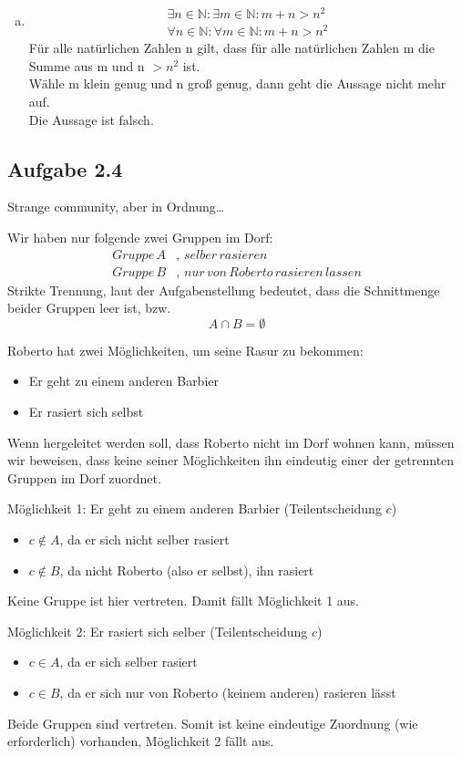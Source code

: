\documentclass{standalone}
\begin{document}
\begin{enumerate}[a)]
    \item \begin{gather}
        \exists n \in \mathbb{N} : \exists m \in \mathbb{N} : m+n > n^2 \\
        \forall n \in \mathbb{N} : \forall m \in \mathbb{N} : m+n > n^2
    \end{gather}
    Für alle natürlichen Zahlen n gilt, dass für alle natürlichen Zahlen m die Summe aus m und n $>n^2$ ist. \\
    Wähle m klein genug und n groß genug, dann geht die Aussage nicht mehr auf. \\
    Die Aussage ist falsch.
\end{enumerate}

\subsection{Aufgabe 2.4}
Strange community, aber in Ordnung\dots

Wir haben nur folgende zwei Gruppen im Dorf:
\begin{align}
    Gruppe\, A&,\, selber\, rasieren \\
    Gruppe\, B&,\, nur\, von\, Roberto\, rasieren\, lassen
\end{align}
Strikte Trennung, laut der Aufgabenstellung bedeutet, dass die Schnittmenge beider Gruppen leer ist, bzw.
$$ A \cap B = \emptyset $$

Roberto hat zwei Möglichkeiten, um seine Rasur zu bekommen:
\begin{itemize}
    \item Er geht zu einem anderen Barbier
    \item Er rasiert sich selbst
\end{itemize}
Wenn hergeleitet werden soll, dass Roberto nicht im Dorf wohnen kann, müssen wir beweisen, dass keine seiner Möglichkeiten ihn eindeutig einer der getrennten Gruppen im Dorf zuordnet.

Möglichkeit 1: Er geht zu einem anderen Barbier (Teilentscheidung $c$)
\begin{itemize}
    \item $c \notin A$, da er sich nicht selber rasiert
    \item $c \notin B$, da nicht Roberto (also er selbst), ihn rasiert
\end{itemize}
Keine Gruppe ist hier vertreten. Damit fällt Möglichkeit 1 aus.

Möglichkeit 2: Er rasiert sich selber (Teilentscheidung $c$)
\begin{itemize}
    \item $c \in A$, da er sich selber rasiert
    \item $c \in B$, da er sich nur von Roberto (keinem anderen) rasieren lässt
\end{itemize}
Beide Gruppen sind vertreten. Somit ist keine eindeutige Zuordnung (wie erforderlich) vorhanden, Möglichkeit 2 fällt aus.
\end{document}
